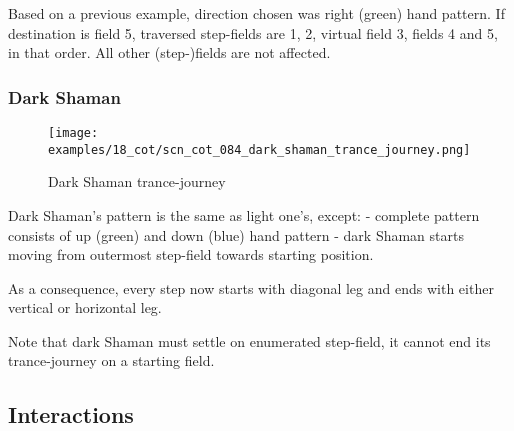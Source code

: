 Based on a previous example, direction chosen was right (green) hand pattern.
If destination is field 5, traversed step-fields are 1, 2, virtual field 3,
fields 4 and 5, in that order. All other (step-)fields are not affected.

\clearpage %

\subsubsection*{Dark Shaman}
\label{sec:Conquest of Tlalocan/Trance-journey/Movement/Dark Shaman}

\vspace*{-1.5\baselineskip}
\noindent
\begin{figure}[!h]
\texttt{[image: examples/18\_cot/scn\_cot\_084\_dark\_shaman\_trance\_journey.png]}
\vspace*{-1.4\baselineskip}
\caption{Dark Shaman trance-journey}
\label{fig:scn_cot_084_dark_shaman_trance_journey}
\end{figure}

\vspace*{-0.5\baselineskip}
Dark Shaman's pattern is the same as light one's, except: \newline
- complete pattern consists of up (green) and down (blue) hand pattern \newline
- dark Shaman starts moving from outermost step-field towards starting position.

As a consequence, every step now starts with diagonal leg and ends with either
vertical or horizontal leg.

\clearpage %

Note that dark Shaman must settle on enumerated step-field, it cannot end its
trance-journey on a starting field.


\subsection*{Interactions}
\label{sec:Conquest of Tlalocan/Trance-journey/Interactions}


